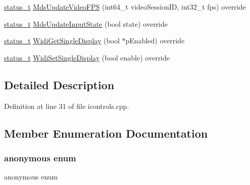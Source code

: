 \begin{DoxyCompactItemize}
\item 
\mbox{\hyperlink{hwcserviceapi_8h_a3806fb2027d9a316d8ca8d9b8b8eb96f}{status\+\_\+t}} \mbox{\hyperlink{classhwcomposer_1_1BpControls_ac8f84bc4b1b6d2be29d9a1c6ccd7c587}{Mds\+Update\+Video\+F\+PS}} (int64\+\_\+t video\+Session\+ID, int32\+\_\+t fps) override
\item 
\mbox{\hyperlink{hwcserviceapi_8h_a3806fb2027d9a316d8ca8d9b8b8eb96f}{status\+\_\+t}} \mbox{\hyperlink{classhwcomposer_1_1BpControls_a382ea9f3e8eb74b555a7997820b0bffb}{Mds\+Update\+Input\+State}} (bool state) override
\item 
\mbox{\hyperlink{hwcserviceapi_8h_a3806fb2027d9a316d8ca8d9b8b8eb96f}{status\+\_\+t}} \mbox{\hyperlink{classhwcomposer_1_1BpControls_a1eddda7462f1a6c37a523e5a8f7a3d30}{Widi\+Get\+Single\+Display}} (bool $\ast$p\+Enabled) override
\item 
\mbox{\hyperlink{hwcserviceapi_8h_a3806fb2027d9a316d8ca8d9b8b8eb96f}{status\+\_\+t}} \mbox{\hyperlink{classhwcomposer_1_1BpControls_a8165eda3de769d8cb703bf25ca21e0d0}{Widi\+Set\+Single\+Display}} (bool enable) override
\end{DoxyCompactItemize}


\subsection{Detailed Description}


Definition at line 31 of file icontrols.\+cpp.



\subsection{Member Enumeration Documentation}
\mbox{\label{classhwcomposer_1_1BpControls_a057cb6d771c68da065640c49e3742446}} 
\subsubsection{\texorpdfstring{anonymous enum}{anonymous enum}}
{\footnotesize\ttfamily anonymous enum}

